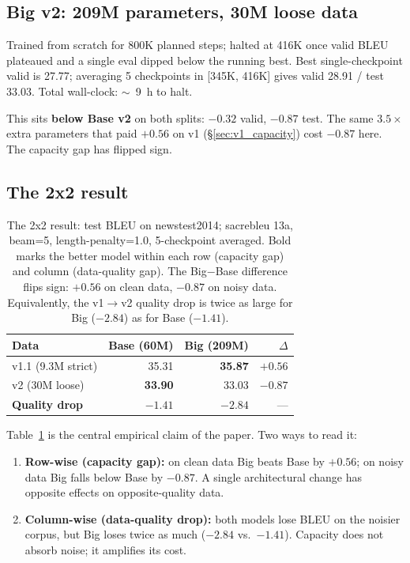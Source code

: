 \subsection{Big v2: 209M parameters, 30M loose data}
\label{sec:big_v2}
Trained from scratch for 800K planned steps; halted at 416K once valid BLEU plateaued and a single eval dipped below the running best. Best single-checkpoint valid is 27.77; averaging 5 checkpoints in [345K, 416K] gives valid 28.91 / test 33.03. Total wall-clock: $\sim$~9~h to halt.

This sits \textbf{below Base v2} on both splits: $-0.32$ valid, $-0.87$ test. The same $3.5\times$ extra parameters that paid $+0.56$ on v1 (\S\ref{sec:v1_capacity}) cost $-0.87$ here. The capacity gap has flipped sign.

\subsection{The 2x2 result}
\label{sec:two_by_two}

\begin{table}[t]
\centering
\small
\begin{tabular}{lrrr}
\toprule
\textbf{Data} & \textbf{Base (60M)} & \textbf{Big (209M)} & \textbf{$\Delta$} \\
\midrule
v1.1 (9.3M strict) & 35.31 & \textbf{35.87} & $\mathbf{+0.56}$ \\
v2 (30M loose)     & \textbf{33.90} & 33.03 & $\mathbf{-0.87}$ \\
\midrule
\textbf{Quality drop} & $-1.41$ & $-2.84$ & --- \\
\bottomrule
\end{tabular}
\caption{The 2x2 result: test BLEU on newstest2014; sacrebleu 13a, beam=5, length-penalty=1.0, 5-checkpoint averaged. Bold marks the better model within each row (capacity gap) and column (data-quality gap). The Big$-$Base difference flips sign: $+0.56$ on clean data, $-0.87$ on noisy data. Equivalently, the v1$\rightarrow$v2 quality drop is twice as large for Big ($-2.84$) as for Base ($-1.41$).}
\label{tab:two_by_two}
\end{table}

Table~\ref{tab:two_by_two} is the central empirical claim of the paper. Two ways to read it:
\begin{enumerate}
\item \textbf{Row-wise (capacity gap):} on clean data Big beats Base by $+0.56$; on noisy data Big falls below Base by $-0.87$. A single architectural change has opposite effects on opposite-quality data.
\item \textbf{Column-wise (data-quality drop):} both models lose BLEU on the noisier corpus, but Big loses twice as much ($-2.84$ vs.\ $-1.41$). Capacity does not absorb noise; it amplifies its cost.
\end{enumerate}


